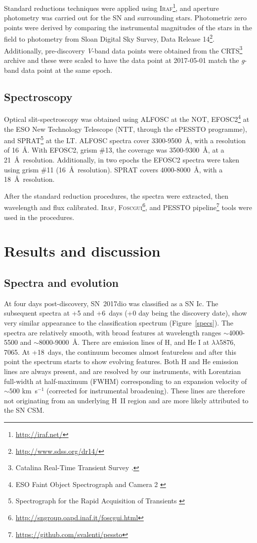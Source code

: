 \documentclass[twocolumn]{aastex61}
\begin{document}
Standard reductions techniques were applied using \textsc{Iraf}\footnote{\href{http://iraf.net/}{http://iraf.net/}}, and aperture photometry was carried out for the SN and surrounding stars. Photometric zero points were derived by comparing the instrumental magnitudes of the stars in the field to  photometry from Sloan Digital Sky Survey, Data Release 14\footnote{\href{http://www.sdss.org/dr14/}{http://www.sdss.org/dr14/}}.
Additionally, pre-discovery \textit{V}-band data points were obtained from the CRTS\footnote{Catalina Real-Time Transient Survey \citep{drake09}.} archive and these were scaled to have the data point at 2017-05-01 match the \textit{g}-band data point at the same epoch.

\subsection{Spectroscopy}
Optical slit-spectroscopy was obtained using ALFOSC at the NOT,  EFOSC2\footnote{ESO Faint Object Spectrograph and Camera 2 \citep{buzzoni84}} at the ESO New Technology Telescope (NTT, through the ePESSTO programme), and SPRAT\footnote{Spectrograph for the Rapid Acquisition of Transients \citep{piascik14}} at the LT.
ALFOSC spectra cover 3300-9500~\AA, with a resolution of 16~\AA. With EFOSC2, {grism} \#13, the coverage was 3500-9300~\AA, at a 21~\AA~resolution. Additionally, in two epochs the EFOSC2 spectra were taken using {grism} \#11 (16~\AA~resolution). SPRAT covers 4000-8000~\AA, with a 18~\AA~resolution.

After the standard reduction procedures, the spectra were extracted, then wavelength and flux calibrated. \textsc{Iraf}, \textsc{Foscgui}\footnote{\href{http://sngroup.oapd.inaf.it/foscgui.html}{http://sngroup.oapd.inaf.it/foscgui.html}}, and PESSTO pipeline\footnote{\href{https://github.com/svalenti/pessto}{https://github.com/svalenti/pessto}} tools were used in the procedures.


\section{Results and discussion}
\subsection{Spectra and evolution}

At four days post-discovery, SN~2017dio was classified as a SN Ic. The subsequent spectra at +5 and +6~days (+0 day being the discovery date), show very similar appearance to the classification spectrum (Figure~\ref{specs}). The spectra are relatively smooth, with broad features {at wavelength ranges} $\sim$4000-5500 and $\sim$8000-9000~\AA. There are emission lines of H, and He I at $\lambda\lambda$5876, 7065. At +18~days, the continuum becomes almost featureless and after this point the spectrum starts to show evolving features. Both H and He emission lines are always present, and are resolved by our instruments, with Lorentzian full-width at half-maximum (FWHM) corresponding to an expansion velocity of $\sim500$ km~s$^{-1}$ (corrected for instrumental broadening).
These lines are therefore not originating from an underlying H~II region and are more likely attributed to the SN CSM.
\end{document}
